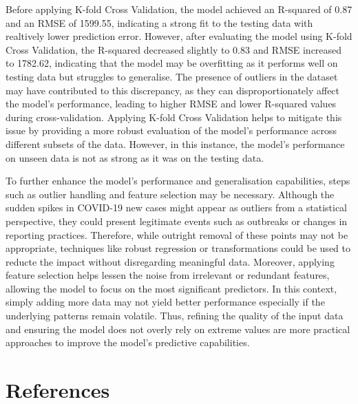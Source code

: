 \documentclass[
]{article}
\begin{document}
Before applying K-fold Cross Validation, the model achieved an R-squared
of 0.87 and an RMSE of 1599.55, indicating a strong fit to the testing
data with realtively lower prediction error. However, after evaluating
the model using K-fold Cross Validation, the R-squared decreased
slightly to 0.83 and RMSE increased to 1782.62, indicating that the
model may be overfitting as it performs well on testing data but
struggles to generalise. The presence of outliers in the dataset may
have contributed to this discrepancy, as they can disproportionately
affect the model's performance, leading to higher RMSE and lower
R-squared values during cross-validation. Applying K-fold Cross
Validation helps to mitigate this issue by providing a more robust
evaluation of the model's performance across different subsets of the
data. However, in this instance, the model's performance on unseen data
is not as strong as it was on the testing data.

To further enhance the model's performance and generalisation
capabilities, steps such as outlier handling and feature selection may
be necessary. Although the sudden spikes in COVID-19 new cases might
appear as outliers from a statistical perspective, they could present
legitimate events such as outbreaks or changes in reporting practices.
Therefore, while outright removal of these points may not be
appropriate, techniques like robust regression or transformations could
be used to reducte the impact without disregarding meaningful data.
Moreover, applying feature selection helps lessen the noise from
irrelevant or redundant features, allowing the model to focus on the
most significant predictors. In this context, simply adding more data
may not yield better performance especially if the underlying patterns
remain volatile. Thus, refining the quality of the input data and
ensuring the model does not overly rely on extreme values are more
practical approaches to improve the model's predictive capabilities.
\vspace{1cm} \newpage

\section*{References}\label{references}
\end{document}
